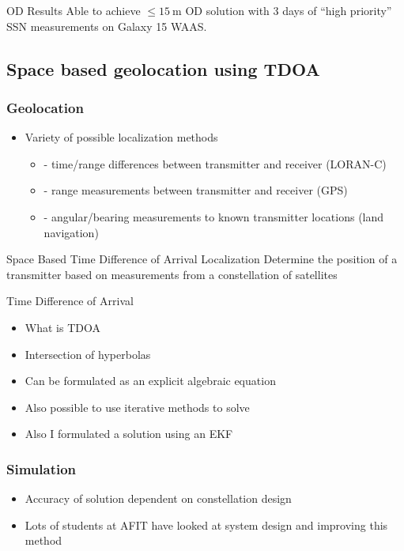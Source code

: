 \begin{frame}[t]
\begin{columns}
\begin{column}{0.5\textwidth}
\begin{center}
        \end{center}
    \end{column}
    \end{columns}
    \begin{block}{OD Results}
        Able to achieve \( \leq \SI{15}{\meter} \) OD solution with 3 days of ``high priority'' SSN measurements on Galaxy 15 WAAS.
    \end{block}
\end{frame}

\subsection[Space TDOA]{Space based geolocation using TDOA}

\begin{frame}[t]\frametitle{Geolocation}
    \begin{itemize}
        \item Variety of possible localization methods
        \begin{itemize}
            \item {} - time/range differences between transmitter and receiver (LORAN-C)
            \item {} - range measurements between transmitter and receiver (GPS)
            \item {} - angular/bearing measurements to known transmitter locations (land navigation)
        \end{itemize}
    \end{itemize}

    \begin{block}{Space Based Time Difference of Arrival Localization}
        Determine the position of a transmitter based on measurements from a constellation of satellites
    \end{block}
\end{frame}

\begin{frame}[t]{Time Difference of Arrival}
    \begin{itemize}
        \item What is TDOA
        \item Intersection of hyperbolas
        \item Can be formulated as an explicit algebraic equation
        \item Also possible to use iterative methods to solve
        \item Also I formulated a solution using an EKF
    \end{itemize}
\end{frame}

\begin{frame}[t]\frametitle{Simulation}
    
\begin{itemize}
    \item Accuracy of solution dependent on constellation design
    \item Lots of students at AFIT have looked at system design and improving this method
\end{itemize}
\end{frame}